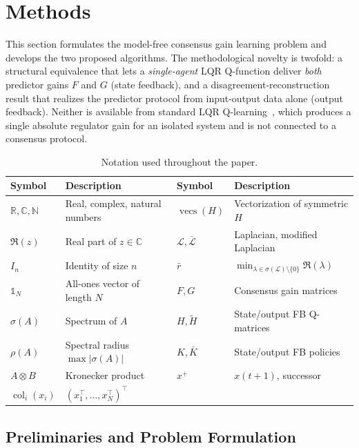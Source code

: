 \documentclass[12pt]{elsarticle}
\theoremstyle{remark}
\DeclareMathOperator{\col}{col}
\DeclareMathOperator{\vecs}{vecs}
\newcommand{\R}{\mathbb{R}}
\newcommand{\N}{\mathbb{N}}
\newcommand{\C}{\mathbb{C}}
\newcommand{\ones}{\mathbb{1}}
\begin{document}
\section{Methods}
\label{sec:methods}
This section formulates the model-free consensus gain learning problem and develops the two proposed algorithms. The methodological novelty is twofold: a structural equivalence that lets a \emph{single-agent} LQR Q-function deliver \emph{both} predictor gains $F$ and $G$ (state feedback), and a disagreement-reconstruction result that realizes the predictor protocol from input-output data alone (output feedback). Neither is available from standard LQR Q-learning~\cite{bradtke1994,lewis2009,rizvi2022}, which produces a single absolute regulator gain for an isolated system and is not connected to a consensus protocol.
\begin{table}[htbp]
\centering
\caption{Notation used throughout the paper.}
\label{tab:notation}
\footnotesize
\setlength{\tabcolsep}{4pt}
\begin{tabular}{@{}llll@{}}
\toprule
\textbf{Symbol} & \textbf{Description} & \textbf{Symbol} & \textbf{Description} \\
\midrule
$\R,\C,\N$ & Real, complex, natural numbers & $\vecs(H)$ & Vectorization of symmetric $H$ \\
$\Re(z)$ & Real part of $z \in \C$ & $\mathcal{L},\bar{\mathcal{L}}$ & Laplacian, modified Laplacian \\
$I_n$ & Identity of size $n$ & $\bar{r}$ & $\min_{\lambda \in \sigma(\mathcal{L})\setminus\{0\}} \Re(\lambda)$ \\
$\ones_N$ & All-ones vector of length $N$ & $F,G$ & Consensus gain matrices \\
$\sigma(A)$ & Spectrum of $A$ & $H,\tilde{H}$ & State/output FB Q-matrices \\
$\rho(A)$ & Spectral radius $\max|\sigma(A)|$ & $K,\bar{K}$ & State/output FB policies \\
$A \otimes B$ & Kronecker product & $x^+$ & $x(t{+}1)$, successor \\
$\col_{i}(x_i)$ & $(x_1^\top,\ldots,x_N^\top)^\top$ & & \\
\bottomrule
\end{tabular}
\end{table}
\subsection{Preliminaries and Problem Formulation}
\label{subsec:prelim}
\end{document}
